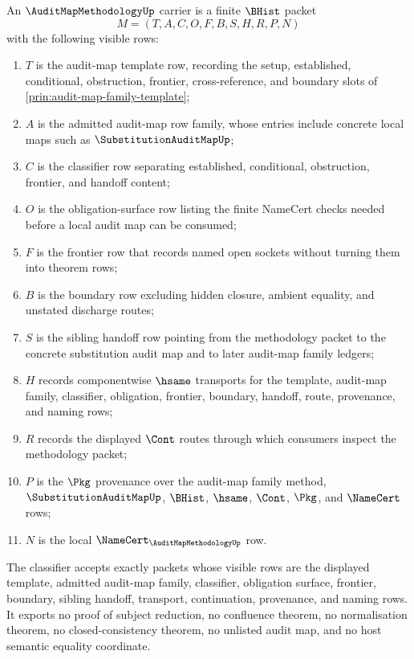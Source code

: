 \begin{definition}
\label{def:audit-map-methodology-carrier}
An $\AuditMapMethodologyUp$ carrier is a finite $\BHist$ packet
$$
M=(T,A,C,O,F,B,S,H,R,P,N)
$$
with the following visible rows:
\begin{enumerate}
\item $T$ is the audit-map template row, recording the setup, established,
conditional, obstruction, frontier, cross-reference, and boundary slots of
\autoref{prin:audit-map-family-template};
\item $A$ is the admitted audit-map row family, whose entries include concrete
local maps such as $\SubstitutionAuditMapUp$;
\item $C$ is the classifier row separating established, conditional,
obstruction, frontier, and handoff content;
\item $O$ is the obligation-surface row listing the finite NameCert checks
needed before a local audit map can be consumed;
\item $F$ is the frontier row that records named open sockets without turning
them into theorem rows;
\item $B$ is the boundary row excluding hidden closure, ambient equality, and
unstated discharge routes;
\item $S$ is the sibling handoff row pointing from the methodology packet to
the concrete substitution audit map and to later audit-map family ledgers;
\item $H$ records componentwise $\hsame$ transports for the template, audit-map
family, classifier, obligation, frontier, boundary, handoff, route,
provenance, and naming rows;
\item $R$ records the displayed $\Cont$ routes through which consumers inspect
the methodology packet;
\item $P$ is the $\Pkg$ provenance over the audit-map family method,
$\SubstitutionAuditMapUp$, $\BHist$, $\hsame$, $\Cont$, $\Pkg$, and
$\NameCert$ rows;
\item $N$ is the local $\NameCert_{\AuditMapMethodologyUp}$ row.
\end{enumerate}
The classifier accepts exactly packets whose visible rows are the displayed
template, admitted audit-map family, classifier, obligation surface, frontier,
boundary, sibling handoff, transport, continuation, provenance, and naming
rows. It exports no proof of subject reduction, no confluence theorem, no
normalisation theorem, no closed-consistency theorem, no unlisted audit map,
and no host semantic equality coordinate.
\end{definition}

